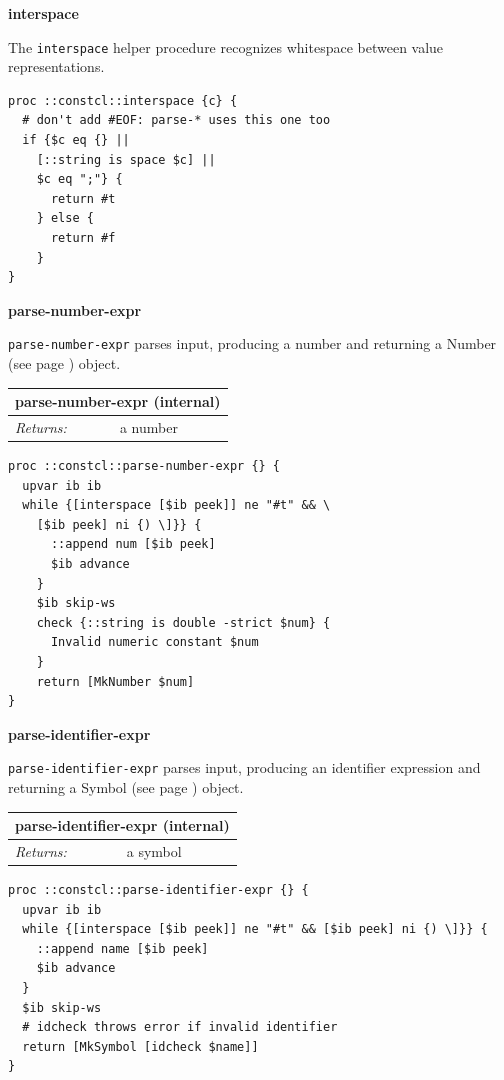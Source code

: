 \documentclass[twoside,9pt]{report}
\begin{document}
\textbf{interspace}


The \texttt{interspace} helper procedure recognizes whitespace between value representations.

\noindent\makebox[\linewidth]{\rule{\linewidth}{0.4pt}}
\begin{lstlisting}
proc ::constcl::interspace {c} {
  # don't add #EOF: parse-* uses this one too
  if {$c eq {} ||
    [::string is space $c] ||
    $c eq ";"} {
      return #t
    } else {
      return #f
    }
}
\end{lstlisting}
\noindent\makebox[\linewidth]{\rule{\linewidth}{0.4pt}}

\textbf{parse-number-expr}


\texttt{parse-number-expr} parses input, producing a number and returning a Number (see page \pageref{numbers}) object.

\begin{tabular}{ |l l| }
\hline
\multicolumn{2}{|l|}{parse-number-expr (internal)} \\
\hline
\textit{Returns:} & a number \\
\hline
\end{tabular}

\noindent\makebox[\linewidth]{\rule{\linewidth}{0.4pt}}
\begin{lstlisting}
proc ::constcl::parse-number-expr {} {
  upvar ib ib
  while {[interspace [$ib peek]] ne "#t" && \
    [$ib peek] ni {) \]}} {
      ::append num [$ib peek]
      $ib advance
    }
    $ib skip-ws
    check {::string is double -strict $num} {
      Invalid numeric constant $num
    }
    return [MkNumber $num]
}
\end{lstlisting}
\noindent\makebox[\linewidth]{\rule{\linewidth}{0.4pt}}

\textbf{parse-identifier-expr}


\texttt{parse-identifier-expr} parses input, producing an identifier expression and returning a Symbol (see page \pageref{symbols}) object.

\begin{tabular}{ |l l| }
\hline
\multicolumn{2}{|l|}{parse-identifier-expr (internal)} \\
\hline
\textit{Returns:} & a symbol \\
\hline
\end{tabular}

\noindent\makebox[\linewidth]{\rule{\linewidth}{0.4pt}}
\begin{lstlisting}
proc ::constcl::parse-identifier-expr {} {
  upvar ib ib
  while {[interspace [$ib peek]] ne "#t" && [$ib peek] ni {) \]}} {
    ::append name [$ib peek]
    $ib advance
  }
  $ib skip-ws
  # idcheck throws error if invalid identifier
  return [MkSymbol [idcheck $name]]
}
\end{lstlisting}
\noindent\makebox[\linewidth]{\rule{\linewidth}{0.4pt}}
\end{document}
